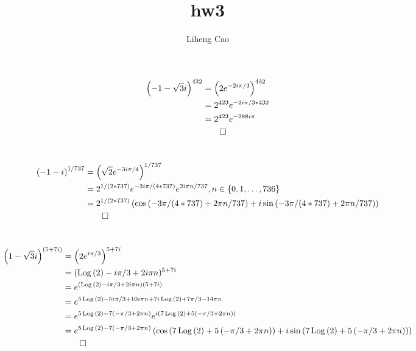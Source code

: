 \documentclass[12pt]{article}
\title{hw3}
\author{Liheng Cao}
\begin{document}
\maketitle

\section{}
\begin{align*}
	\left(-1-\sqrt{3}i\right)^{432} &= \left(2e^{-2i\pi/3}\right)^{432}\\
	&= 2^{423}e^{-2i\pi/3 * 432}\\
	&= 2^{423}e^{-288i\pi}\\
	&\qed
\end{align*}
\newpage

\section{}
\begin{align*}
	\left(-1-i\right)^{1/737} &= \left(\sqrt{2}e^{-3i\pi/4}\right)^{1/737}\\
	&= 2^{1/(2 * 737)} e^{-3i\pi/(4*737)}e^{2i\pi n/737}, n \in \{0, 1, \ldots, 736\}\\
	&= 2^{1/(2 * 737)} \left(\cos{(-3\pi/(4*737) + 2\pi n/737)} + i\sin{(-3\pi/(4*737)+ 2\pi n/737)}\right)\\
	&\qed
\end{align*}
\newpage

\section{}
\begin{align*}
	\left(1-\sqrt{3}i\right)^{\left(5+7i\right)} &= \left(2e^{i\pi/3}\right)^{5+7i}\\
	&= (\operatorname{Log}{(2)} - i\pi/3 + 2i\pi n)^{5+7i} \\
	&= e^{(\operatorname{Log}{(2)} - i\pi/3 + 2i\pi n)(5+7i)} \\
	&= e^{5\operatorname{Log}{(2)} - 5i\pi/3 +10i\pi n + 7i\operatorname{Log}{(2)} +7\pi/3 - 14\pi n}\\
	&= e^{5\operatorname{Log}{(2)} - 7\left(-\pi/3 + 2\pi n\right)} e^{i(7\operatorname{Log}{(2)} + 5\left(-\pi/3 + 2\pi n\right))} \\
	&= e^{5\operatorname{Log}{(2)} - 7\left(-\pi/3 + 2\pi n\right)} \left(\cos{(7\operatorname{Log}{(2)} + 5\left(-\pi/3 + 2\pi n\right))} + i\sin{(7\operatorname{Log}{(2)} + 5\left(-\pi/3 + 2\pi n\right))}\right)\\
	&\qed
\end{align*}
\newpage
\end{document}
